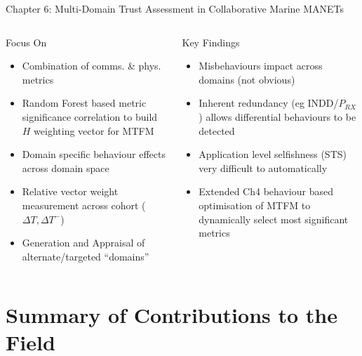 \documentclass[aspectratio=169]{beamer}
\begin{document}
\begin{frame}{Chapter 6: Multi-Domain Trust Assessment in Collaborative Marine MANETs}
	\begin{columns}
		\begin{column}{0.5\textwidth}
			\begin{block}{Focus On}
				\begin{itemize}
					\item Combination of comms. \& phys. metrics
					\item Random Forest based metric significance correlation to build $H$ weighting vector for MTFM
					\item Domain specific behaviour effects across domain space
					\item Relative vector weight measurement across cohort ($\Delta T, \Delta T^-$)
					\item Generation and Appraisal of alternate/targeted ``domains''
				\end{itemize}
			\end{block}
		\end{column}
		\begin{column}{0.5\textwidth}
			\begin{exampleblock}{Key Findings}
				\begin{itemize}
					\item Misbehaviours impact across domains (not obvious) \hyperlink{fig:alternate_domain_diag}{}
					\item Inherent redundancy (eg INDD/$P_{RX}$) allows differential behaviours to be detected \hyperlink{fig:positive_heat}{}
					\item Application level selfishness (STS) very difficult to automatically 
					\item Extended Ch4 behaviour based optimisation of MTFM to dynamically select most significant metrics
				\end{itemize}
			\end{exampleblock}
		\end{column}
	\end{columns}
\end{frame}



\section*{Summary of Contributions to the Field}
\end{document}
